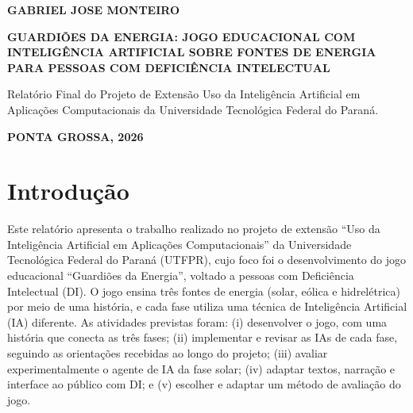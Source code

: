 \documentclass[12pt,a4paper]{article}
\begin{document}
\begin{titlepage}
\thispagestyle{fancy} %
\centering
\vspace*{1cm}
{\large\bfseries GABRIEL JOSE MONTEIRO\par}
\vspace{5cm}
{\large\bfseries GUARDIÕES DA ENERGIA: JOGO EDUCACIONAL COM INTELIGÊNCIA ARTIFICIAL SOBRE FONTES DE ENERGIA PARA PESSOAS COM DEFICIÊNCIA INTELECTUAL\par}
\vspace{2.5cm}
\begin{flushright}
\begin{minipage}{0.55\textwidth}
\singlespacing
Relatório Final do Projeto de Extensão Uso da Inteligência Artificial em Aplicações Computacionais da Universidade Tecnológica Federal do Paraná.
\end{minipage}
\end{flushright}
\vfill
{\bfseries PONTA GROSSA, 2026\par}
\end{titlepage}

\section{Introdução}

Este relatório apresenta o trabalho realizado no projeto de extensão ``Uso da Inteligência Artificial em Aplicações Computacionais'' da Universidade Tecnológica Federal do Paraná (UTFPR), cujo foco foi o desenvolvimento do jogo educacional ``Guardiões da Energia'', voltado a pessoas com Deficiência Intelectual (DI). O jogo ensina três fontes de energia (solar, eólica e hidrelétrica) por meio de uma história, e cada fase utiliza uma técnica de Inteligência Artificial (IA) diferente. As atividades previstas foram: (i) desenvolver o jogo, com uma história que conecta as três fases; (ii) implementar e revisar as IAs de cada fase, seguindo as orientações recebidas ao longo do projeto; (iii) avaliar experimentalmente o agente de IA da fase solar; (iv) adaptar textos, narração e interface ao público com DI; e (v) escolher e adaptar um método de avaliação do jogo.
\end{document}
